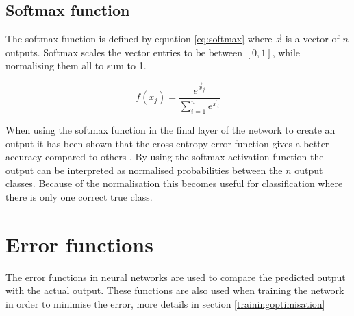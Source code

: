 \subsection{Softmax function}
The softmax function is defined by equation \ref{eq:softmax} where $\vec{x}$ is a vector of $n$ outputs. Softmax scales the vector entries to be between $[0,1]$, while normalising them all to sum to 1.

\begin{equation} \label{eq:softmax}
    f(x_j) = \frac{e^{\vec{x}_j}}{\sum_{i=1}^{n} e^{\vec{x}_i}}
\end{equation}

When using the softmax function in the final layer of the network to create an output it has been shown that the cross entropy error function gives a better accuracy compared to others \parencite{dunne1997pairing,golik2013cross}. By using the softmax activation function the output can be interpreted as normalised probabilities between the $n$ output classes. Because of the normalisation this becomes useful for classification where there is only one correct true class.

\section{Error functions} \label{errorfunction}
The error functions in neural networks are used to compare the predicted output with the actual output. These functions are also used when training the network in order to minimise the error, more details in section \ref{trainingoptimisation}

